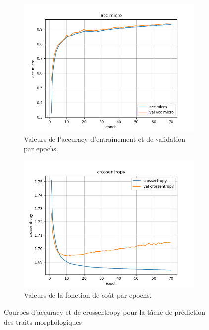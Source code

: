 \documentclass[a4paper]{article}
\begin{document}
\begin{figure}[H]
    \centering
    \begin{subfigure}{0.45\textwidth}
        \centering
        \includegraphics[width=\linewidth]{../logs/get_morphy_sep0_French_3/acc micro.png}
        \caption{Valeurs de l'accuracy d'entraînement et de validation par epochs.}
    \end{subfigure}
    \hfill
    \begin{subfigure}{0.45\textwidth}
        \centering
        \includegraphics[width=\linewidth]{../logs/get_morphy_sep0_French_3/crossentropy.png}
        \caption{Valeurs de la fonction de coût par epochs.}
    \end{subfigure}
    \caption{Courbes d'accuracy et de crossentropy pour la tâche de prédiction des traits morphologiques}
\end{figure}
\end{document}
